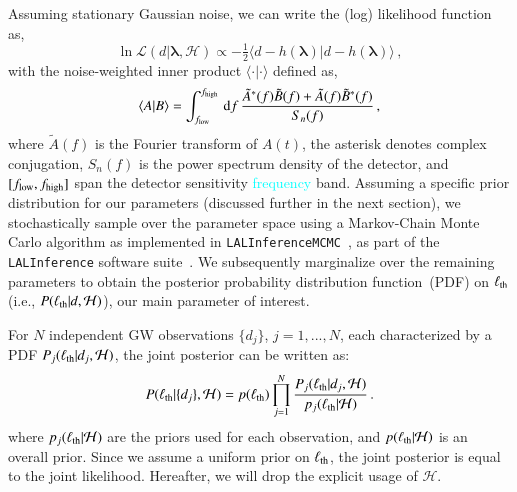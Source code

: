 \documentclass[twocolumn,
               prd,
               aps,
               superscriptaddress,
               tightenlines,
               nofootinbib,
               eqsecnum,
               amsfonts,
               amsmath,
               longbibliography]{revtex4-1}
\newcommand{\dd}{{\rm d}}
\newcommand{\ab}[1]{{\textcolor{cyan}{{#1}} }}
\begin{document}
Assuming stationary Gaussian noise, we can write the (log) likelihood function as,
%
\begin{equation}
\ln \mathcal{L}(d \vert \bm{\lambda},\mathcal{H}) \propto
- \tfrac{1}{2}
\langle
d - h(\bm{\lambda}) \vert d - h(\bm{\lambda})
\rangle\,,
\end{equation}
%
with the noise-weighted inner product $\langle \cdot | \cdot \rangle$ defined as,
%
\begin{equation}
\langle A | B \rangle =
\int_{f_{\rm low}}^{f_{\rm high}} \, \dd f \,
\frac{\tilde{A}^{\ast}(f) \tilde{B}(f) + \tilde{A}(f) \tilde{B}^{\ast}(f)}{S_{n}(f)}\,,
\end{equation}
%
where $\tilde{A}(f)$ is the Fourier transform of $A(t)$, the asterisk denotes
complex conjugation, $S_{n}(f)$ is the power spectrum density of the
detector, and $[f_{\rm low}, f_{\rm high}]$ span the detector sensitivity \ab{frequency} band.
%
Assuming a specific prior distribution for our parameters (discussed further in the next section), we stochastically
sample over the parameter space using a Markov-Chain Monte Carlo algorithm as implemented in
\texttt{LALInferenceMCMC}~\cite{Rover:2006ni,vanderSluys:2008qx}, as part of the \texttt{LALInference} software suite~\cite{Veitch:2014wba,lalsuite}.
%
We subsequently marginalize over the remaining parameters to obtain the
posterior probability distribution function~(PDF) on $\ell_{\rm th}$ (i.e., $P(\ell_{\rm th} \vert d,\mathcal{H})$),
our main parameter of interest.

For $N$ independent GW observations $\{d_j\}$, $j=1,...,N$, each characterized
by a PDF $P_j(\ell_{\rm th} \vert d_j,\mathcal{H})$, the
joint posterior can be written as:
%
\begin{equation}
P(\ell_{\rm th} | \{d_j\},\mathcal{H}) = p(\ell_{\rm th}) \prod_{j=1}^{N} \frac{P_j(\ell_{\rm th} | d_j,\mathcal{H})}{p_j(\ell_{\rm th}|\mathcal{H})}\,.
\label{eq:cumulative_dist_ell}
\end{equation}
%
where $p_j(\ell_{\rm th} | \mathcal{H})$ are the priors used for each observation, and $p(\ell_{\rm th} | \mathcal{H})$ is an overall prior.
%
Since we assume a uniform prior on $\ell_{\rm th}$, the joint posterior is
equal to the joint likelihood. Hereafter, we will drop the explicit usage of
$\mathcal{H}$.
%
%
\end{document}
